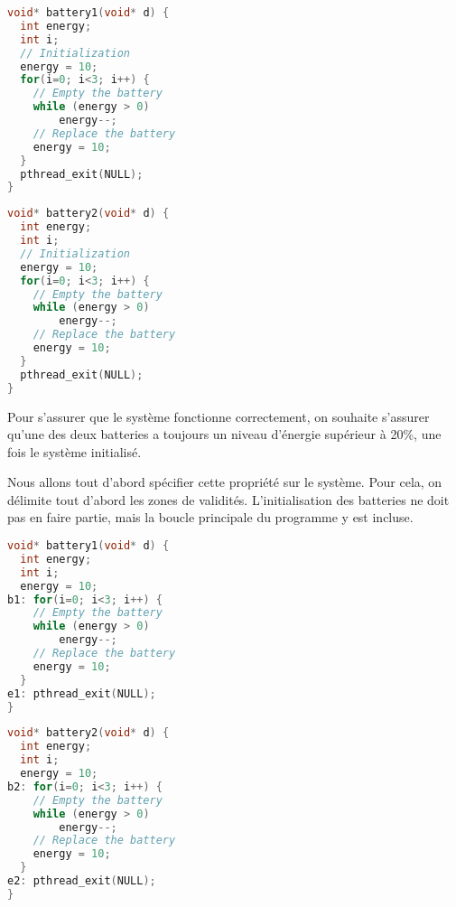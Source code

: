 \noindent\begin{minipage}{.45\textwidth}
\begin{lstlisting}[language=C, frame=single, caption=Thread 1]
void* battery1(void* d) {
  int energy;
  int i;
  // Initialization
  energy = 10;
  for(i=0; i<3; i++) {
    // Empty the battery
    while (energy > 0)
        energy--;
    // Replace the battery
    energy = 10;
  }
  pthread_exit(NULL);
}
\end{lstlisting}
\end{minipage}\hfill
\begin{minipage}{.45\textwidth}
\begin{lstlisting}[language=C, frame=single, caption=Thread 2]
void* battery2(void* d) {
  int energy;
  int i;
  // Initialization
  energy = 10;
  for(i=0; i<3; i++) {
    // Empty the battery
    while (energy > 0)
        energy--;
    // Replace the battery
    energy = 10;
  }
  pthread_exit(NULL);
}
\end{lstlisting}
\end{minipage}

Pour s'assurer que le système fonctionne correctement, on souhaite s'assurer
qu’une des deux batteries a toujours un niveau d'énergie supérieur à 20\%, une
fois le système initialisé.

Nous allons tout d'abord spécifier cette propriété sur le système. Pour cela, on
délimite tout d'abord les zones de validités. L'initialisation des batteries ne
doit pas en faire partie, mais la boucle principale du programme y est incluse.

\noindent\begin{minipage}{.45\textwidth}
\begin{lstlisting}[language=C, frame=single, caption=Thread 1 avec labels]
void* battery1(void* d) {
  int energy;
  int i;
  energy = 10;
b1: for(i=0; i<3; i++) {
    // Empty the battery
    while (energy > 0)
        energy--;
    // Replace the battery
    energy = 10;
  }
e1: pthread_exit(NULL);
}
\end{lstlisting}
\end{minipage}\hfill
\begin{minipage}{.45\textwidth}
\begin{lstlisting}[language=C, frame=single, caption=Thread 2 avec labels]
void* battery2(void* d) {
  int energy;
  int i;
  energy = 10;
b2: for(i=0; i<3; i++) {
    // Empty the battery
    while (energy > 0)
        energy--;
    // Replace the battery
    energy = 10;
  }
e2: pthread_exit(NULL);
}
\end{lstlisting}
\end{minipage}

